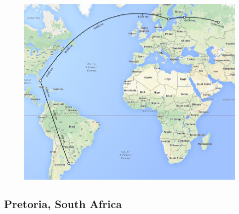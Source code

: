 \begin{figure}[htp]
 \centering
  \includegraphics[width=5in]{imgs/maps/perm.png}
\end{figure}

\subsection{Pretoria, South Africa}

